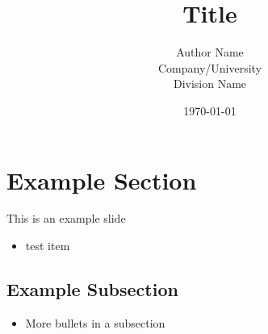\documentclass[aspectratio=169]{beamer}                  %
\title{Title}                                   %
\author{
	Author Name\\                               %
	Company/University\\                        %
	Division Name
}
\date{\today}
\newcommand{\srule}{
	\rule{\textwidth}{1pt}\\
}
\newlength{\subsecwidth}
\newenvironment{slide}{
	\begin{frame}                                    %
		\settowidth{\subsecwidth}{\insertsubsection} %
		\ifthenelse{\dimtest{\subsecwidth}{<}{1pt}}{ %
			\frametitle{\huge \insertsection\\             %
				\vspace{-1ex}                            %
			}
		}{                                           %
			\frametitle{\huge \insertsection\ -- \insertsubsection\\ %
				\vspace{-1ex}                            %
			}
		}
		\Large                                       %
	}{
	\end{frame}
}
\begin{document}
\begin{frame}                           %
	\titlepage                          %
\end{frame}

\section{Example Section}
\begin{slide}
	This is an example slide
	\begin{itemize}
		\item test item
	\end{itemize}

\end{slide}

\subsection{Example Subsection}
\begin{slide}
	\begin{itemize}
		\item More bullets in a subsection
	\end{itemize}
\end{slide}
\end{document}
